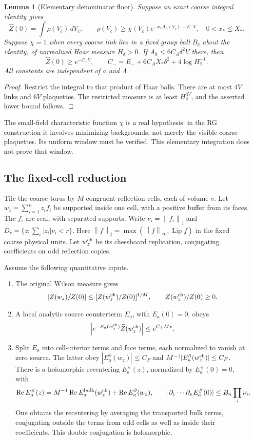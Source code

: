\documentclass[11pt]{article}
\newtheorem{lemma}[proposition]{Lemma}
\theoremstyle{remark}
\newcommand{\Rea}{\operatorname{Re}}
\newcommand{\norm}[1]{\left\|#1\right\|}
\newcommand{\abs}[1]{\left|#1\right|}
\begin{document}
\begin{lemma}[Elementary denominator floor]
Suppose an exact coarse integral identity gives
\[
\widehat Z(0)=\int \rho(V_c)\,dV_c,\qquad
\rho(V_c)\geq\chi(V_c)e^{-x_*A_h(V_c)-E_-V},
\quad 0<x_*\leq X_*.
\]
Suppose $\chi=1$ when every coarse link lies in a fixed group ball
$B_\delta$ about the identity, of normalized Haar measure $H_\delta>0$.
If $A_h\leq 6C_A\delta^2V$ there, then
\[
\widehat Z(0)\geq e^{-C_-V},\qquad
C_-=E_-+6C_AX_*\delta^2+4\log H_\delta^{-1}.
\]
All constants are independent of $a$ and $\Lambda$.
\end{lemma}
\begin{proof}
Restrict the integral to that product of Haar balls. There are at most
$4V$ links and $6V$ plaquettes. The restricted measure is at least
$H_\delta^{4V}$, and the asserted lower bound follows.
\end{proof}

The small-field characteristic function $\chi$ is a real hypothesis:
in the RG construction it involves minimizing backgrounds, not merely
the visible coarse plaquettes. Its uniform window must be verified.
This elementary integration does not prove that window.

\subsection{The fixed-cell reduction}

Tile the coarse torus by $M$ congruent reflection cells, each of volume $v$.
Let $w_z=\sum_{i=1}^n z_i f_i$ be supported inside one cell, with a positive
buffer from its faces. The $f_i$ are real, with separated supports.
Write $\nu_i=\norm{f_i}_\sharp$ and
$D_r=\{z:\sum_i|z_i|\nu_i<r\}$.
Here $\norm f_\sharp=\max(\norm f_\infty,\operatorname{Lip}f)$
in the fixed coarse physical units.
Let $w_z^{\rm ch}$ be its chessboard replication, conjugating coefficients
on odd reflection copies.

Assume the following quantitative inputs.
\begin{enumerate}
\item The original Wilson measure gives
\[
 \abs{Z(w_z)/Z(0)}
 \leq [Z(w_z^{\rm ch})/Z(0)]^{1/M},
 \qquad Z(w_z^{\rm ch})/Z(0)\geq0.
\]
\item A local analytic source counterterm $E_a$, with $E_a(0)=0$, obeys
\[
 \abs{e^{-E_a(w_z^{\rm ch})}\widehat Z(w_z^{\rm ch})}
 \leq e^{C_+Mv}.
\]
\item Split $E_a$ into cell-interior terms and face terms, each normalized
to vanish at zero source. The latter obey
$|E_a^\partial(w_z)|\leq C_F$ and
$M^{-1}|E_a^\partial(w_z^{\rm ch})|\leq C_F$.
There is a holomorphic recentering $E_a^\#(z)$, normalized by
$E_a^\#(0)=0$, with
\[
 \Rea E_a^\#(z)
 =M^{-1}\Rea E_a^{\rm bulk}(w_z^{\rm ch})
   +\Rea E_a^\partial(w_z),
 \qquad
 |\partial_1\cdots\partial_n E_a^\#(0)|
 \leq B_n\prod_i\nu_i.
\]
One obtains the recentering by averaging the transported bulk terms,
conjugating outside the terms from odd cells as well as inside their
coefficients. This double conjugation is holomorphic.
\end{enumerate}
\end{document}

